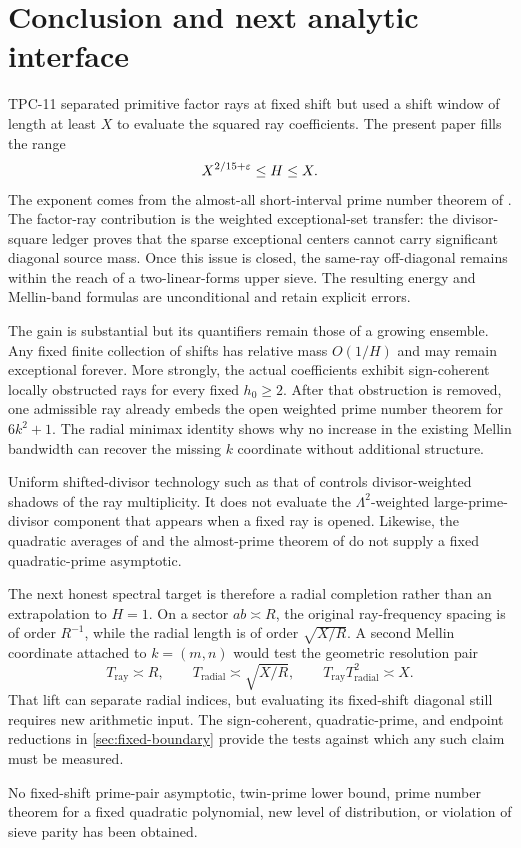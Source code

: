 \section{Conclusion and next analytic interface}
\label{sec:conclusion}

TPC-11 separated primitive factor rays at fixed shift but used a shift
window of length at least $X$ to evaluate the squared ray coefficients.
The present paper fills the range
\[
 X^{2/15+\varepsilon}\leq H\leq X.
\]
The exponent comes from the almost-all short-interval prime number
theorem of \citet{GuthMaynard2026}.  The factor-ray contribution is the
weighted exceptional-set transfer: the divisor-square ledger proves that
the sparse exceptional centers cannot carry significant diagonal source
mass.  Once this issue is closed, the same-ray off-diagonal remains within
the reach of a two-linear-forms upper sieve.  The resulting energy and
Mellin-band formulas are unconditional and retain explicit errors.

The gain is substantial but its quantifiers remain those of a growing
ensemble.  Any fixed finite collection of shifts has relative mass
$O(1/H)$ and may remain exceptional forever.  More strongly, the actual
coefficients exhibit sign-coherent locally obstructed rays for every
fixed $h_0\geq2$.  After that obstruction is removed, one admissible ray
already embeds the open weighted prime number theorem for $6k^2+1$.
The radial minimax identity shows why no increase in the existing Mellin
bandwidth can recover the missing $k$ coordinate without additional
structure.

Uniform shifted-divisor technology such as that of
\citet{AssingBlomerLi2021} controls divisor-weighted shadows of the ray
multiplicity.  It does not evaluate the $\Lambda^2$-weighted
large-prime-divisor component that appears when a fixed ray is opened.
Likewise, the quadratic averages of \citet{BaierZhao2009} and the
almost-prime theorem of \citet{Iwaniec1978} do not supply a fixed
quadratic-prime asymptotic.

The next honest spectral target is therefore a radial completion rather
than an extrapolation to $H=1$.  On a sector $ab\asymp R$, the original
ray-frequency spacing is of order $R^{-1}$, while the radial length is
of order $\sqrt{X/R}$.  A second Mellin coordinate attached to
$k=(m,n)$ would test the geometric resolution pair
\[
 T_{\mathrm{ray}}\asymp R,
 \qquad
 T_{\mathrm{radial}}\asymp\sqrt{X/R},
 \qquad
 T_{\mathrm{ray}}T_{\mathrm{radial}}^2\asymp X.
\]
That lift can separate radial indices, but evaluating its fixed-shift
diagonal still requires new arithmetic input.  The sign-coherent,
quadratic-prime, and endpoint reductions in
\cref{sec:fixed-boundary} provide the tests against which any such claim
must be measured.

No fixed-shift prime-pair asymptotic, twin-prime lower bound, prime number
theorem for a fixed quadratic polynomial, new level of distribution, or
violation of sieve parity has been obtained.
